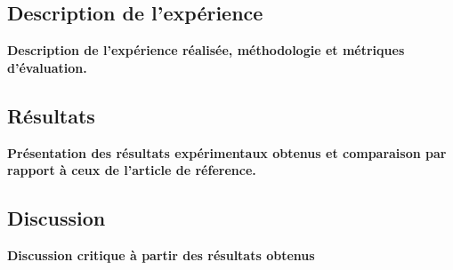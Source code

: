 

\subsection{Description de l'expérience}
 
\textbf{Description de l'expérience réalisée, méthodologie et métriques d'évaluation.} \\

\lipsum[4]

\subsection{Résultats}
 
\textbf{Présentation des résultats expérimentaux obtenus et  comparaison par rapport à ceux de l’article de réference.} \\

\lipsum[5]

\subsection{Discussion}

\textbf{Discussion critique à partir des
résultats obtenus} \\

\lipsum[6]


